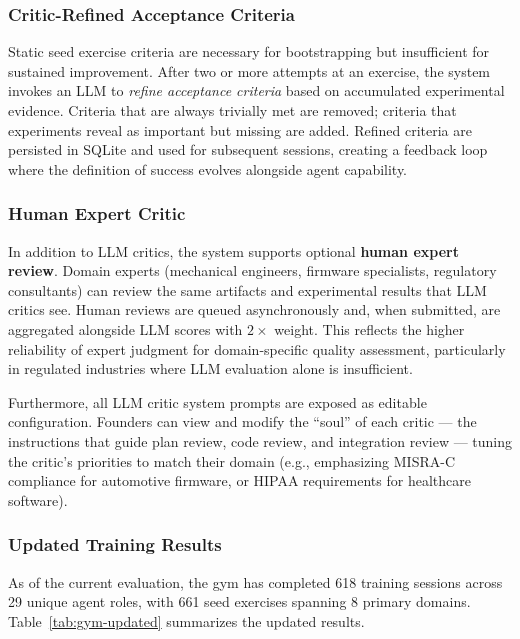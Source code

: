 \documentclass[11pt,a4paper]{article}
\begin{document}
\subsubsection{Critic-Refined Acceptance Criteria}

Static seed exercise criteria are necessary for bootstrapping but insufficient for sustained improvement. After two or more attempts at an exercise, the system invokes an LLM to \emph{refine acceptance criteria} based on accumulated experimental evidence. Criteria that are always trivially met are removed; criteria that experiments reveal as important but missing are added. Refined criteria are persisted in SQLite and used for subsequent sessions, creating a feedback loop where the definition of success evolves alongside agent capability.

\subsubsection{Human Expert Critic}

In addition to LLM critics, the system supports optional \textbf{human expert review}. Domain experts (mechanical engineers, firmware specialists, regulatory consultants) can review the same artifacts and experimental results that LLM critics see. Human reviews are queued asynchronously and, when submitted, are aggregated alongside LLM scores with $2\times$ weight. This reflects the higher reliability of expert judgment for domain-specific quality assessment, particularly in regulated industries where LLM evaluation alone is insufficient.

Furthermore, all LLM critic system prompts are exposed as editable configuration. Founders can view and modify the ``soul'' of each critic --- the instructions that guide plan review, code review, and integration review --- tuning the critic's priorities to match their domain (e.g., emphasizing MISRA-C compliance for automotive firmware, or HIPAA requirements for healthcare software).

\subsubsection{Updated Training Results}

As of the current evaluation, the gym has completed 618 training sessions across 29 unique agent roles, with 661 seed exercises spanning 8 primary domains. Table~\ref{tab:gym-updated} summarizes the updated results.
\end{document}
